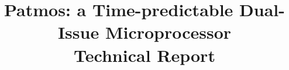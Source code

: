 \documentclass{IEEEtran}
\begin{document}
\title{Patmos: a Time-predictable Dual-Issue Microprocessor\\
	{\huge Technical Report}}


%





\maketitle
\end{document}
